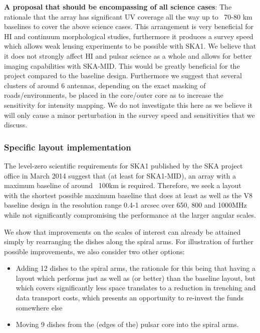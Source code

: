 \documentclass[sfheadings,a4paper,times,9pt,floats,floatfix]{article}
\begin{document}
{\bf A proposal that should be encompassing of all science cases}: The rationale that the array
has significant UV coverage all the way up to ~70-80 km baselines to cover the above
science cases. This arrangement is very beneficial for HI and continuum morphological studies,
furthermore it produces a survey speed which allows weak lensing experiments to be
possible with SKA1. We believe that it does not strongly affect HI and pulsar science as a whole and allows for
better imaging capabilities with SKA-MID. This would be greatly beneficial for the project
compared to the baseline design. Furthermore we suggest that several clusters of around 6
antennas, depending on the exact masking of roads/environments, be placed in the core/outer
core as to increase the sensitivity for intensity mapping. We do not
investigate this here as we believe it will only cause a minor perturbation in
the survey speed and sensitivities that we discuss.

\subsubsection{Specific layout implementation}
The level-zero scientific requirements for SKA1\cite{srd} published by the SKA project office in March 2014
suggest that (at least for SKA1-MID), an array with a maximum baseline of around ~100km is required. Therefore, we seek
a layout with the shortest possible maximum baseline that does at least as well as the V8 baseline design in the
resolution range 0.4-1 arcsec over 650, 800 and 1000MHz while not significantly compromising the performance at the
larger angular scales. 

We show that improvements on the scales of interest can already be attained simply by rearranging the dishes along 
the spiral arms. For illustration of further possible improvements, we also consider two other options: 

\begin{itemize}
\item Adding 12 dishes to the spiral arms, the rationale for this 
being that having a layout which performs just as well as (or better) than the baseline layout, but which 
covers significantly less space translates to a reduction in trenching and data transport
costs, which presents an opportunity to re-invest the funds somewhere else

\item Moving 9 dishes from the (edges of the) pulsar core into the spiral arms. 
\end{itemize}
\end{document}

